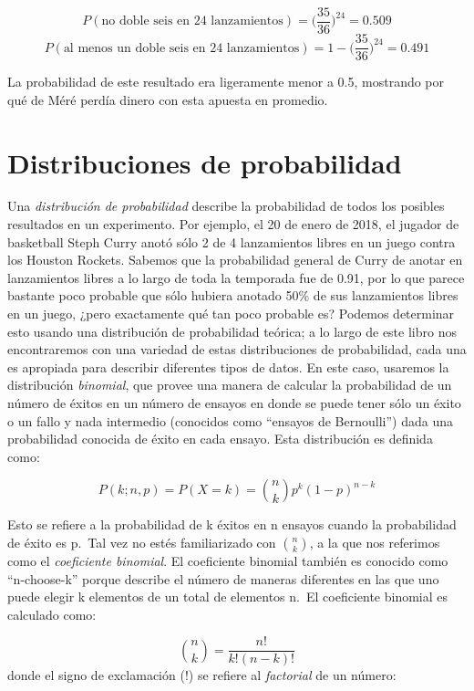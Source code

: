 \documentclass[
  12pt,
]{book}
\begin{document}
\[
P(\text{no doble seis en 24 lanzamientos}) = \bigg(\frac{35}{36}\bigg)^{24}=0.509
\]
\[
P(\text{al menos un doble seis en 24 lanzamientos}) = 1 - \bigg(\frac{35}{36}\bigg)^{24}=0.491
\]

La probabilidad de este resultado era ligeramente menor a 0.5, mostrando por qué de Méré perdía dinero con esta apuesta en promedio.

\hypertarget{distribuciones-de-probabilidad}{%
\section{Distribuciones de probabilidad}\label{distribuciones-de-probabilidad}}

Una \emph{distribución de probabilidad} describe la probabilidad de todos los posibles resultados en un experimento. Por ejemplo, el 20 de enero de 2018, el jugador de basketball Steph Curry anotó sólo 2 de 4 lanzamientos libres en un juego contra los Houston Rockets. Sabemos que la probabilidad general de Curry de anotar en lanzamientos libres a lo largo de toda la temporada fue de 0.91, por lo que parece bastante poco probable que sólo hubiera anotado 50\% de sus lanzamientos libres en un juego, ¿pero exactamente qué tan poco probable es? Podemos determinar esto usando una distribución de probabilidad teórica; a lo largo de este libro nos encontraremos con una variedad de estas distribuciones de probabilidad, cada una es apropiada para describir diferentes tipos de datos. En este caso, usaremos la distribución \emph{binomial}, que provee una manera de calcular la probabilidad de un número de éxitos en un número de ensayos en donde se puede tener sólo un éxito o un fallo y nada intermedio (conocidos como ``ensayos de Bernoulli'') dada una probabilidad conocida de éxito en cada ensayo. Esta distribución es definida como:

\[
P(k; n,p) = P(X=k) = \binom{n}{k} p^k(1-p)^{n-k}
\]

Esto se refiere a la probabilidad de k éxitos en n ensayos cuando la probabilidad de éxito es p.~Tal vez no estés familiarizado con \(\binom{n}{k}\), a la que nos referimos como el \emph{coeficiente binomial}. El coeficiente binomial también es conocido como ``n-choose-k'' porque describe el número de maneras diferentes en las que uno puede elegir k elementos de un total de elementos n.~El coeficiente binomial es calculado como:

\[
\binom{n}{k} = \frac{n!}{k!(n-k)!}
\]
donde el signo de exclamación (!) se refiere al \emph{factorial} de un número:
\end{document}
